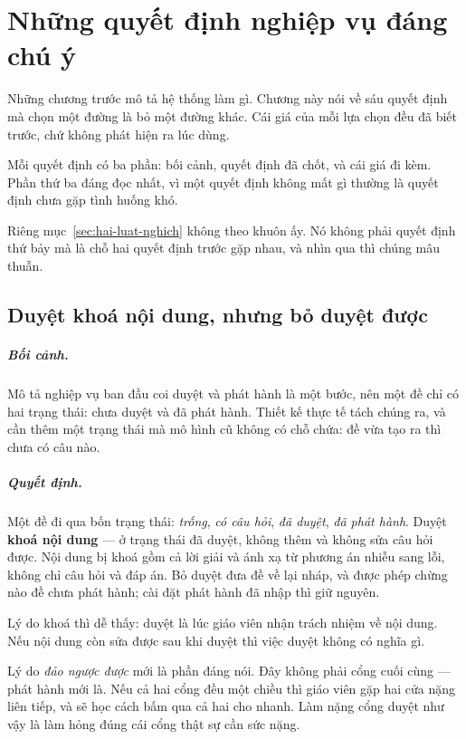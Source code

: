\chapter{Những quyết định nghiệp vụ đáng chú ý}
\label{ch:quyet-dinh}

Những chương trước mô tả hệ thống làm gì. Chương này nói về sáu quyết định mà chọn một đường
là bỏ một đường khác. Cái giá của mỗi lựa chọn đều đã biết trước, chứ không phát hiện ra lúc
dùng.

Mỗi quyết định có ba phần: bối cảnh, quyết định đã chốt, và cái giá đi kèm. Phần thứ ba đáng
đọc nhất, vì một quyết định không mất gì thường là quyết định chưa gặp tình huống khó.

Riêng mục~\ref{sec:hai-luat-nghich} không theo khuôn ấy. Nó không phải quyết định thứ bảy mà là
chỗ hai quyết định trước gặp nhau, và nhìn qua thì chúng mâu thuẫn.

\section{Duyệt khoá nội dung, nhưng bỏ duyệt được}

\paragraph{Bối cảnh.} Mô tả nghiệp vụ ban đầu coi duyệt và phát hành là một bước, nên một đề chỉ
có hai trạng thái: chưa duyệt và đã phát hành. Thiết kế thực tế tách chúng ra, và cần thêm một
trạng thái mà mô hình cũ không có chỗ chứa: đề vừa tạo ra thì chưa có câu nào.

\paragraph{Quyết định.} Một đề đi qua bốn trạng thái: \emph{trống}, \emph{có câu hỏi},
\emph{đã duyệt}, \emph{đã phát hành}. Duyệt \textbf{khoá nội dung} --- ở trạng thái đã duyệt,
không thêm và không sửa câu hỏi được. Nội dung bị khoá gồm cả lời giải và ánh xạ từ phương án
nhiễu sang lỗi, không chỉ câu hỏi và đáp án. Bỏ duyệt đưa đề về lại nháp, và được phép chừng nào
đề chưa phát hành; cài đặt phát hành đã nhập thì giữ nguyên.

Lý do khoá thì dễ thấy: duyệt là lúc giáo viên nhận trách nhiệm về nội dung. Nếu nội dung còn sửa
được sau khi duyệt thì việc duyệt không có nghĩa gì.

Lý do \emph{đảo ngược được} mới là phần đáng nói. Đây không phải cổng cuối cùng --- phát hành
mới là. Nếu cả hai cổng đều một chiều thì giáo viên gặp hai cửa nặng liên tiếp, và sẽ học cách
bấm qua cả hai cho nhanh. Làm nặng cổng duyệt như vậy là làm hỏng đúng cái cổng thật sự cần sức
nặng.

